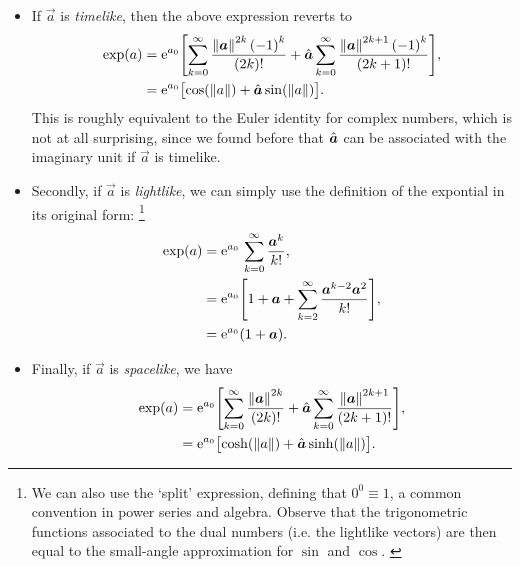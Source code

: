 \begin{itemize}
    \item If $\vec{a}$ is \emph{timelike}, then the above expression reverts to
        \begin{equation}
            \begin{split}
                \exp(a) &= \ec^{a_0}\qty[\sum_{k=0}^\infty \frac{\norm{\vec{a}}^{2k}\,\qty(-1)^k}{(2k)!} + \uvec{a}\sum_{k=0}^\infty \frac{\norm{\vec{a}}^{2k+1} \, \qty(-1)^k}{(2k+1)!}], \\
                        &= \ec^{a_0}\qty\big[\cos(\norm{a})  + \uvec{a}\sin(\norm{a})]. \\
            \end{split}
        \end{equation}
        This is roughly equivalent to the Euler identity for complex numbers, which is not at all surprising, since we found before that $\uvec{a}$ can be associated with the imaginary unit if $\vec{a}$ is timelike.
    \item Secondly, if $\vec{a}$ is \emph{lightlike}, we can simply use the definition of the expontial in its original form: \footnote{We can also use the `split' expression, defining that $0^0 \equiv 1$, a common convention in power series and algebra. Observe that the trigonometric functions associated to the dual numbers (i.e. the lightlike vectors) are then equal to the small-angle approximation for $\sin$ and $\cos$. \cite{Graham1994, Harkin2004}}
        \begin{equation}
            \begin{split}
                \exp(a) &= \ec^{a_0}\,\sum^{\infty}_{k=0} \frac{\vec{a}^k}{k!}, \\
                        &= \ec^{a_0}\qty[1 + \vec{a} + \sum^{\infty}_{k=2} \frac{\vec{a}^{k-2}\vec{a}^2}{k!}], \\
                        &= \ec^{a_0}\qty(1 + \vec{a}). \\
            \end{split}
        \end{equation}
    \item Finally, if $\vec{a}$ is \emph{spacelike}, we have
        \begin{equation}
            \begin{split}
                \exp(a) &= \ec^{a_0}\qty[\sum_{k=0}^\infty \frac{\norm{\vec{a}}^{2k}}{(2k)!} 
                           + \uvec{a}\sum_{k=0}^\infty \frac{\norm{\vec{a}}^{2k+1}}{(2k+1)!}], \\
                        &= \ec^{a_0}\qty\big[\cosh(\norm{a}) + \uvec{a}\sinh(\norm{a})]. \\
            \end{split}
        \end{equation}
\end{itemize}
